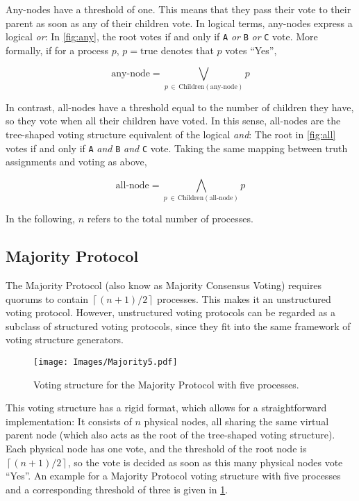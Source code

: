 \documentclass[11pt,chapterprefix=true,toc=bibliography,numbers=noendperiod,
               footnotes=multiple,twoside]{scrreprt}
\begin{document}
Any-nodes have a threshold of one. This means that they pass their vote to their parent as soon as any of their children vote. In logical terms, any-nodes express a logical \emph{or}: In \cref{fig:any}, the root votes if and only if \texttt{A} \emph{or} \texttt{B} \emph{or} \texttt{C} vote. More formally, if for a process \(p\), \(p = \text{true}\) denotes that \(p\) votes \enquote{Yes},

\[ \text{any-node} = \bigvee_{p\,\in\,\text{Children}(\text{any-node})} p \]

In contrast, all-nodes have a threshold equal to the number of children they have, so they vote when all their children have voted. In this sense, all-nodes are the tree-shaped voting structure equivalent of the logical \emph{and}: The root in \cref{fig:all} votes if and only if \texttt{A} \emph{and} \texttt{B} \emph{and} \texttt{C} vote. Taking the same mapping between truth assignments and voting as above,

\[ \text{all-node} = \bigwedge_{p\,\in\,\text{Children}(\text{all-node})} p \]

In the following, \(n\) refers to the total number of processes.

\subsection{Majority Protocol\label{ssc:majority}}

The Majority Protocol (also know as Majority Consensus Voting\autocite{majority}) requires quorums to contain \(\left\lceil (n + 1) / 2 \right\rceil\) processes. This makes it an unstructured voting protocol. However, unstructured voting protocols can be regarded as a subclass of structured voting protocols, since they fit into the same framework of voting structure generators.

\begin{figure}[h]
    \centering
    \texttt{[image: Images/Majority5.pdf]}
    \caption{Voting structure for the Majority Protocol with five processes.}
    \label{fig:majority5-struct}
\end{figure}

This voting structure has a rigid format, which allows for a straightforward implementation: It consists of \(n\) physical nodes, all sharing the same virtual parent node (which also acts as the root of the tree-shaped voting structure). Each physical node has one vote, and the threshold of the root node is \(\left\lceil (n + 1) / 2 \right\rceil\), so the vote is decided as soon as this many physical nodes vote \enquote{Yes}. An example for a Majority Protocol voting structure with five processes and a corresponding threshold of three is given in \cref{fig:majority5-struct}.
\end{document}
